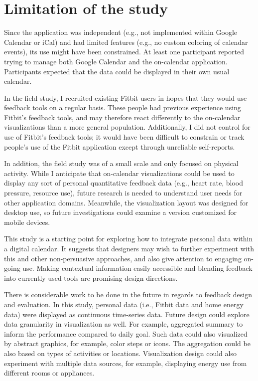 \documentclass[12pt,oneside]{book}
\begin{document}
\section{Limitation of the study}

Since the application was independent (e.g., not implemented within Google Calendar or iCal) and had limited features (e.g., no custom coloring of calendar events), its use might have been constrained. At least one participant reported trying to manage both Google Calendar and the on-calendar application. Participants expected that the data could be displayed in their own usual calendar.

In the field study, I recruited existing Fitbit users in hopes that they would use feedback tools on a regular basis. These people had previous experience using Fitbit's feedback tools, and may therefore react differently to the on-calendar visualizations than a more general population. Additionally, I did not control for use of Fitbit's feedback tools; it would have been difficult to constrain or track people's use of the Fitbit application except through unreliable self-reports.

In addition, the field study was of a small scale and only focused on physical activity. While I anticipate that on-calendar visualizations could be used to display any sort of personal quantitative feedback data (e.g., heart rate, blood pressure, resource use), future research is needed to understand user needs for other application domains. Meanwhile, the visualization layout was designed for desktop use, so future investigations could examine a version customized for mobile devices.

This study is a starting point for exploring how to integrate personal data within a digital calendar. It suggests that designers may wish to further experiment with this and other non-persuasive approaches, and also give attention to engaging on-going use. Making contextual information easily accessible and blending feedback into currently used tools are promising design directions.


\label{chap:future work}
There is considerable work to be done in the future in regards to feedback design and evaluation. In this study, personal data (i.e., Fitbit data and home energy data) were displayed as continuous time-series data. Future design could explore data granularity in visualization as well. For example, aggregated summary to inform the performance compared to daily goal. Such data could also visualized by abstract graphics, for example, color steps or icons. The aggregation could be also based on types of activities or locations. Visualization design could also experiment with multiple data sources, for example, displaying energy use from different rooms or appliances.
\end{document}
